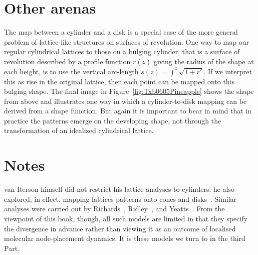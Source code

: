 \section{Other arenas}
The map between a cylinder and a disk is a special case of the more general problem of lattice-like structures on surfaces of revolution. One way to map our regular cylindrical lattices to those on a bulging cylinder, that is a surface of revolution described by a profile function $r(z)$ giving the radius of the shape at each height, is to use the vertical arc-length $s(z)=\int^z \sqrt{1+r'}$.  If we interpret this as rise in the original lattice, then each point can be mapped 
onto this bulging shape. The final image in Figure~\ref{fig:Txb0605Pineapple} shows the shape from above and illustrates 
one way in which a cylinder-to-disk mapping can be derived from a shape function. But again it is important to bear in mind that in practice the patterns emerge on the developing shape, not through the transformation of an idealized cylindrical lattice. 

\section{Notes}
van Iterson himself did not restrict his lattice analyses to cylinders: he also explored, in effect, mapping lattices patterns onto cones and disks~\cite{vanitersonjrMathematischeUndMikroscopischAnatomische1907}. 
 Similar analyses were carried out by Richards~\cite{richardsPhyllotaxisItsQuantitative1951}, Ridley~\cite{ridleyIdealPhyllotaxisGeneral2001}, and Yeatts~\cite{yeattsGrowthcontrolledModelShape2004}. From the viewpoint of this book, though, all such models are limited in that they specify the divergence in advance  rather than viewing it as an outcome of  localised molecular node-placement dynamics. It is these models we turn to in the third Part. 